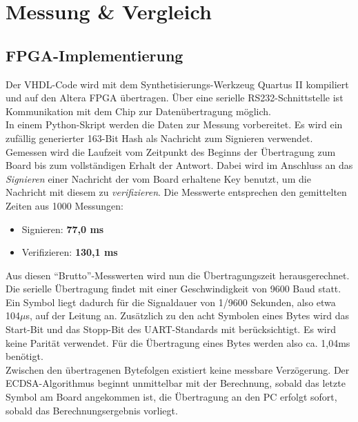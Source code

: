 
\chapter{Messung \& Vergleich} \label{sec:messung}

\section{FPGA-Implementierung}

Der VHDL-Code wird mit dem Synthetisierungs-Werkzeug Quartus II kompiliert und auf den Altera FPGA übertragen. Über eine serielle RS232-Schnittstelle ist Kommunikation mit dem Chip zur Datenübertragung möglich. \\

In einem Python-Skript werden die Daten zur Messung vorbereitet. Es wird ein zufällig generierter 163-Bit Hash als Nachricht zum Signieren verwendet. Gemessen wird die Laufzeit vom Zeitpunkt des Beginns der Übertragung zum Board bis zum vollständigen Erhalt der Antwort. Dabei wird im Anschluss an das \textit{Signieren} einer Nachricht der vom Board erhaltene Key benutzt, um die Nachricht mit diesem zu \textit{verifizieren}. Die Messwerte entsprechen den gemittelten Zeiten aus 1000 Messungen: \\

\begin{itemize}
	\item Signieren: \textbf{77,0 ms}
	\item Verifizieren: \textbf{130,1 ms}\\
\end{itemize}

Aus diesen ``Brutto''-Messwerten wird nun die Übertragungszeit herausgerechnet. Die serielle Übertragung findet mit einer Geschwindigkeit von 9600 Baud statt. Ein Symbol liegt dadurch für die Signaldauer von 1/9600 Sekunden, also etwa 104$\mu$s, auf der Leitung an. Zusätzlich zu den acht Symbolen eines Bytes wird das Start-Bit und das Stopp-Bit des UART-Standards mit berücksichtigt. Es wird keine Parität verwendet. Für die Übertragung eines Bytes werden also ca. 1,04ms benötigt. \\

Zwischen den übertragenen Bytefolgen existiert keine messbare Verzögerung. Der ECDSA-Algorithmus beginnt unmittelbar mit der Berechnung, sobald das letzte Symbol am Board angekommen ist, die Übertragung an den PC erfolgt sofort, sobald das Berechnungsergebnis vorliegt. \\

